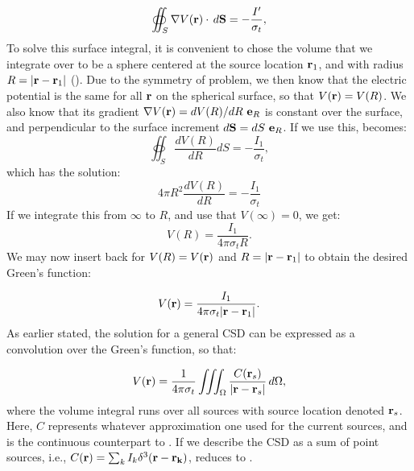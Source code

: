\begin{equation}
\oiint_{S} \nabla V({\bf r}) \cdot \, d{\bf S}  = - \frac{I'}{\sigma_t},
\label{eq:VC:berit1}
\end{equation}
To solve this surface integral, it is convenient to chose the volume that we integrate over 
to be a sphere centered at the source location ${\bf r}_1$, 
and with radius $R = |{\bf r}-{\bf r}_1|$ (). 
Due to the symmetry of problem, we then know that the electric potential 
is the same for all ${\bf r}$ on the spherical surface, so that $V({\bf r}) = V(R)$. 
We also know that its gradient $\nabla V({\bf r}) = d V(R)/dR ~{\bf e}_R$ is constant over the surface, 
and perpendicular to the surface increment $d{\bf S} = dS {~\bf e}_R$. 
If we use this,  becomes:
\begin{equation}
\oiint_{S} \frac{d V(R)}{dR} d{S}  = - \frac{I_1}{\sigma_t},
\label{eq:VC:berit1ogenhalv}
\end{equation}
which has the solution:
\begin{equation}
4\pi R^2 \frac{d V(R)}{dR} = -\frac{I_1}{\sigma_t}
\label{eq:VC:berit2}
\end{equation}
If we integrate this from $\infty$ to $R$, and use that $V(\infty) = 0$, we get:
\begin{equation}
V(R) =  \frac{I_1}{4\pi \sigma_t R}.
\label{eq:VC:berit3}
\end{equation}
We may now insert back for $V(R)= V({\bf r})$ and $R = |{\bf r}-{\bf r}_1|$ to obtain the desired Green's function:

\begin{equation}
V({\bf r})= \frac{I_1}{4\pi \sigma_t |{\bf r}-{\bf r}_1|}.
\label{eq:VC:berit4}
\end{equation}
As earlier stated, the solution for a general CSD can be expressed as a convolution over the Green's function, so that:

\begin{equation}
V({\bf r}) = \frac{1}{4\pi \sigma_t}\iiint_{\Omega} \frac{C({\bf r}_s)}{|{\bf r}-{\bf r}_s|} \,d\Omega,
\label{eq:VC:csds}
\end{equation}
where the volume integral runs over all sources with source location denoted ${\bf r}_s$. 
Here, $C$ represents whatever approximation one used for the current sources, 
and  is the continuous counterpart to . 
If we describe the CSD as a sum of point sources, i.e.,  
$C({\bf r}) = \sum_k I_k \delta^3({\bf r} - {\bf r_k})$,  
 reduces to .


